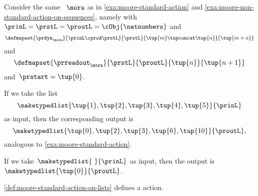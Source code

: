\begin{example}
    \label{exa:moore-non-standard-action-on-lists}
    Consider the same ~$\mora$ as in \cref{exa:moore-standard-action} and \cref{exa:moore-non-standard-action-on-sequences}, namely with~$\prinL = \prstL = \proutL = \cObj{\natnumbers}$
    and
    \begin{equation}
        \defmapset{
            \prdyn_\mora
        }{
            \prinL \cprod \prstL
        }{
            \prstL
        }{
            \tup{m} \tupconcat \tup{n}
        }{
            \tup{m + n}
        }
    \end{equation}
    and
    \begin{equation}
        \defmapset{
            \prreadout_\mora
        }{
            \prstL
        }{
            \proutL
        }{
            \tup{n}
        }{
            \tup{n+1}
        }
    \end{equation}
    and~$\prstart = \tup{0}$.

    If we take the list
    \begin{equation}
        \maketypedlist{\tup{1}, \tup{2}, \tup{3}, \tup{4}, \tup{5}}{\prinL}
    \end{equation}
    as input, then the corresponding output is
    \begin{equation}
        \maketypedlist{\tup{0}, \tup{2}, \tup{3}, \tup{6}, \tup{10}}{\proutL},
    \end{equation}
    analogous to \cref{exa:moore-standard-action}.

    If we take~$\maketypedlist{\ }{\prinL}$ as input, then the output is~$\maketypedlist{\tup{0}}{\proutL}$.
\end{example}


\begin{lemma}\label{lem:moore-standard-action-on-lists}
    \cref{def:moore-standard-action-on-lists} defines a  action.
\end{lemma}

